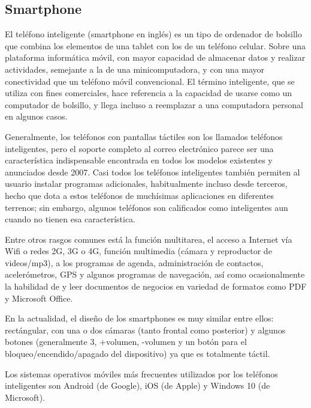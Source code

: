 \subsection{Smartphone}
			\par 
				El teléfono inteligente (smartphone en inglés) es un tipo de ordenador de bolsillo que combina los elementos de una tablet con los de un teléfono celular. Sobre una plataforma informática móvil, con mayor capacidad de almacenar datos y realizar actividades, semejante a la de una minicomputadora, y con una mayor conectividad que un teléfono móvil convencional. El término inteligente, que se utiliza con fines comerciales, hace referencia a la capacidad de usarse como un computador de bolsillo, y llega incluso a reemplazar a una computadora personal en algunos casos.		
			\par \noindent
				Generalmente, los teléfonos con pantallas táctiles son los llamados teléfonos inteligentes, pero el soporte completo al correo electrónico parece ser una característica indispensable encontrada en todos los modelos existentes y anunciados desde 2007. Casi todos los teléfonos inteligentes también permiten al usuario instalar programas adicionales, habitualmente incluso desde terceros, hecho que dota a estos teléfonos de muchísimas aplicaciones en diferentes terrenos; sin embargo, algunos teléfonos son calificados como inteligentes aun cuando no tienen esa característica.			
			\par \noindent
				Entre otros rasgos comunes está la función multitarea, el acceso a Internet vía Wifi o redes 2G, 3G o 4G, función multimedia (cámara y reproductor de videos/mp3), a los programas de agenda, administración de contactos, acelerómetros, GPS y algunos programas de navegación, así como ocasionalmente la habilidad de y leer documentos de negocios en variedad de formatos como PDF y Microsoft Office.
			\par \noindent
				En la actualidad, el diseño de los smartphones es muy similar entre ellos: rectángular, con una o dos cámaras (tanto frontal como posterior) y algunos botones (generalmente 3, +volumen, -volumen y un botón para el bloqueo/encendido/apagado del dispositivo) ya que es totalmente táctil.
			\par \noindent
				Los sistemas operativos móviles más frecuentes utilizados por los teléfonos inteligentes son Android (de Google), iOS (de Apple) y Windows 10 (de Microsoft).